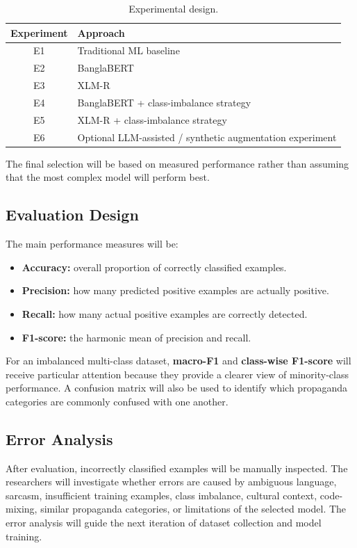 \documentclass[12pt,a4paper]{report}
\begin{document}
\begin{table}[H]
\centering
\caption{Experimental design.}\label{tab:experiments}
\renewcommand{\arraystretch}{1.25}
\begin{tabular}{@{}cl@{}}
\toprule
\textbf{Experiment} & \textbf{Approach}\\
\midrule
E1 & Traditional ML baseline\\
E2 & BanglaBERT\\
E3 & XLM-R\\
E4 & BanglaBERT + class-imbalance strategy\\
E5 & XLM-R + class-imbalance strategy\\
E6 & Optional LLM-assisted / synthetic augmentation experiment\\
\bottomrule
\end{tabular}
\end{table}
The final selection will be based on measured performance rather than assuming that
the most complex model will perform best.

\subsection{Evaluation Design}
The main performance measures will be:
\begin{itemize}
  \item \textbf{Accuracy:} overall proportion of correctly classified examples.
  \item \textbf{Precision:} how many predicted positive examples are actually positive.
  \item \textbf{Recall:} how many actual positive examples are correctly detected.
  \item \textbf{F1-score:} the harmonic mean of precision and recall.
\end{itemize}
For an imbalanced multi-class dataset, \textbf{macro-F1} and \textbf{class-wise
F1-score} will receive particular attention because they provide a clearer view of
minority-class performance. A confusion matrix will also be used to identify which
propaganda categories are commonly confused with one another.

\subsection{Error Analysis}
After evaluation, incorrectly classified examples will be manually inspected. The
researchers will investigate whether errors are caused by ambiguous language,
sarcasm, insufficient training examples, class imbalance, cultural context,
code-mixing, similar propaganda categories, or limitations of the selected model.
The error analysis will guide the next iteration of dataset collection and model
training.
\end{document}
